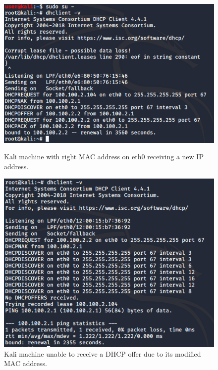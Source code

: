 \begin{figure}[H]
\centering
\begin{minipage}{.33\textwidth}
  \centering
  \includegraphics[width=1\textwidth]{dhcp_kali_macOk.png}
  \caption[a]{Kali machine with right MAC address on eth0 receiving a new IP address.}\label{fig:6}
\end{minipage}%
\begin{minipage}{.33\textwidth}
  \centering
  \includegraphics[width=1\textwidth]{dhcp_kali_macNotOk.png}
  \caption[a]{Kali machine unable to receive a DHCP offer due to its modified MAC address.}\label{fig:7}
\end{minipage}
\begin{minipage}{.33\textwidth}
  \centering

\end{minipage}
\end{figure}
